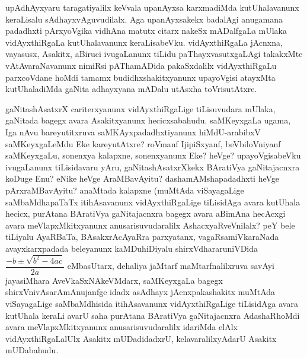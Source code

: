 upAdhAyxyaru taragatiyalilx keVvala upanAyxsa karxmadiMda kutUhalavanunx keraLi\-salu sAdhayxvAguvudilalx. Aga upanAyxsakekx badalAgi anugamana padadhxti pArxyoVgika vidhAna matutx citarx nakeSx mADalfgaLa mUlaka vidAyxthiRgaLa kutUhalavanunx keraLisabeVku. vidAyxthiRgaLa jAcnxna, vayasusx, Asakitx, aBiruci ivugaLanunx tiLidu paThayxvasutxgaLAgi takakxMte vAtAvaraNavanunx nimiRsi pAThamADida pakaSxdalilx vidAyxthiRgaLu parxcoVdane hoMdi tamamx budidhxshakitxyanunx upayoVgisi atayxMta kutUhaladiMda gaNita adhayxyana mADalu utAsxha toVrisutAtxre.

gaNitashAsatxrX cariterxyanunx vidAyxthiRgaLige tiLisuvudara mUlaka, gaNitada bagegx avara Asakitxyanunx hecicxsabahudu. saMKeyxgaLa ugama, Iga nAvu bareyutitxruva saMKAyxpadadhxtiyanunx hiMdU-arabibxV saMKeyxgaLeMdu Eke kareyutAtxre? roVmanf IjipiSx\-yanf, beVbiloVniyanf saMKeyxgaLu, sonenxya kalapxne, sonenxyanunx Eke? heVge? upayoVgisabeVku ivugaLanunx tiLisidavaru yAru, gaNitashAsatxrXkekx BAratiVya gaNita\-jacnxra koDuge Enu? eNike heVge AraMBavAyitu? dashamAMshapadadhxti heVge pArxraMBa\-vAyitu? anaMtada kalapxne (muMtAda viSayagaLige saMbaMdhapaTaTx itihAsavanunx vidAyxthiR\-gaLige tiLisidAga avara kutUhala hecicx, purAtana BAratiVya gaNitajacnxra bagegx avara aBimAna hecAcxgi avara meVlapxMkitxyanunx anusarisuvudaralilx AshacxyaR\-veVnilalx? peY bele tiLiyalu AyaRBaTa, BAsakxrAcAyaRra parxyatanx, vagaRsamiVkaraNada avayxkarxpadada beleyanunx kaMDuhiDiyalu shirxVdhararuniVDida $\dfrac{-b \pm \sqrt{b^2-4ac}}{2a}$ eMba\break sUtarx, dehaliya jaMtarf maMtarfnalilxruva savAyi jayasiMhara AveVkaSxNAkeVMdarx, saMKeyxgaLa bagegx shirxVnivAsarAmAnujanfge idadx asAdhayx jAcnxpakashakitx muMtAda viSayagaLige saMbaMdhisida itihAsavanunx vidAyxthiRgaLige tiLisidAga avara kutUhala keraLi avarU saha purAtana BAratiVya gaNitajacnxra AdashaRhoMdi avara meVlapxMkitxyanunx anusarisuvudaralilx idariMda elAlx vidAyxthiRgaLalUlx Asakitx mUDadidadxrU, kelavaralilx\-yAdarU Asakitx mUDabahudu.

